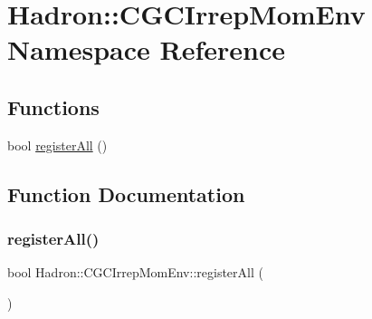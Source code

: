 \hypertarget{namespaceHadron_1_1CGCIrrepMomEnv}{}\section{Hadron\+:\+:C\+G\+C\+Irrep\+Mom\+Env Namespace Reference}
\label{namespaceHadron_1_1CGCIrrepMomEnv}
\subsection*{Functions}
\begin{DoxyCompactItemize}
\item 
bool \mbox{\hyperlink{namespaceHadron_1_1CGCIrrepMomEnv_af8421782c41f7dee9d5b4a17fc748862}{register\+All}} ()
\end{DoxyCompactItemize}


\subsection{Function Documentation}
\mbox{\label{namespaceHadron_1_1CGCIrrepMomEnv_af8421782c41f7dee9d5b4a17fc748862}} 
\subsubsection{\texorpdfstring{registerAll()}{registerAll()}}
{\footnotesize\ttfamily bool Hadron\+::\+C\+G\+C\+Irrep\+Mom\+Env\+::register\+All (\begin{DoxyParamCaption}{ }\end{DoxyParamCaption})}

